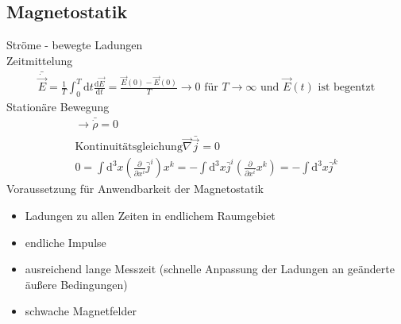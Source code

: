 \documentclass[a4paper]{article}
\begin{document}
\subsection{Magnetostatik}
Ströme - bewegte Ladungen\\
Zeitmittelung
\begin{align}
\bar{\dot{\vec{E}}}=\frac{1}{T}\int_0^T \mathrm{d}t
\frac{\mathrm{d}\vec{E}}{\mathrm{d}t}=\frac{\vec{E}(0)-\vec{E}(0)}{T}\rightarrow 0 \text{ für }
T\rightarrow \infty \text{ und } \vec{E}(t) \text{ ist begentzt}
\end{align}
Stationäre Bewegung
\begin{align}
\rightarrow \bar{\dot{\rho}}=0\\
\text{Kontinuitätsgleichung} \vec{\nabla}\bar{{\vec{j}}}=0\\
0=\int \mathrm{d}^3x\left( \frac{\partial}{\partial x^i}\bar{j}^i \right)x^k=
-\int \mathrm{d}^3x \bar{j}^i \left( \frac{\partial}{\partial x^i}x^k \right)=-\int \mathrm{d}^3x
\bar{j}^k
\end{align}
Voraussetzung für Anwendbarkeit der Magnetostatik
\begin{itemize}
  \item Ladungen zu allen Zeiten in endlichem Raumgebiet
  \item endliche Impulse
  \item ausreichend lange Messzeit (schnelle Anpassung der Ladungen an geänderte
  äußere Bedingungen)
  \item schwache Magnetfelder
\end{itemize}
\end{document}
